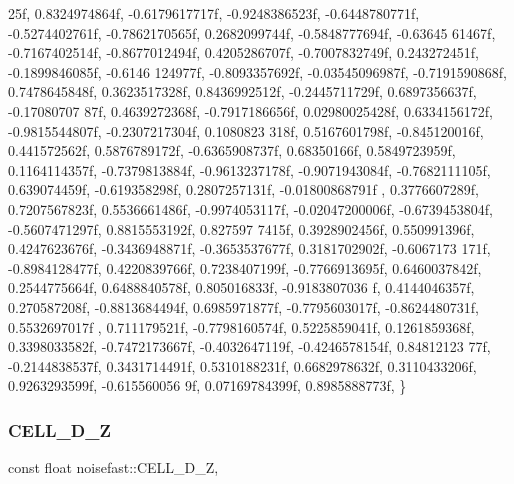 \begin{DoxyCode}
      25f, 0.8324974864f, -0.6179617717f,
    -0.9248386523f, -0.6448780771f, -0.5274402761f, -0.7862170565f, 0.2682099744f, -0.5848777694f, -0.63645
      61467f, -0.7167402514f, -0.8677012494f, 0.4205286707f, -0.7007832749f, 0.243272451f, -0.1899846085f, -0.6146
      124977f, -0.8093357692f, -0.03545096987f,
    -0.7191590868f, 0.7478645848f, 0.3623517328f, 0.8436992512f, -0.2445711729f, 0.6897356637f, -0.17080707
      87f, 0.4639272368f, -0.7917186656f, 0.02980025428f, 0.6334156172f, -0.9815544807f, -0.2307217304f, 0.1080823
      318f, 0.5167601798f, -0.845120016f,
    0.441572562f, 0.5876789172f, -0.6365908737f, 0.68350166f, 0.5849723959f, 0.1164114357f, -0.7379813884f,
       -0.9613237178f, -0.9071943084f, -0.7682111105f, 0.639074459f, -0.619358298f, 0.2807257131f, -0.01800868791f
      , 0.3776607289f, 0.7207567823f,
    0.5536661486f, -0.9974053117f, -0.02047200006f, -0.6739453804f, -0.5607471297f, 0.8815553192f, 0.827597
      7415f, 0.3928902456f, 0.550991396f, 0.4247623676f, -0.3436948871f, -0.3653537677f, 0.3181702902f, -0.6067173
      171f, -0.8984128477f, 0.4220839766f,
    0.7238407199f, -0.7766913695f, 0.6460037842f, 0.2544775664f, 0.6488840578f, 0.805016833f, -0.9183807036
      f, 0.4144046357f, 0.270587208f, -0.8813684494f, 0.6985971877f, -0.7795603017f, -0.8624480731f, 0.5532697017f
      , 0.711179521f, -0.7798160574f,
    0.5225859041f, 0.1261859368f, 0.3398033582f, -0.7472173667f, -0.4032647119f, -0.4246578154f, 0.84812123
      77f, -0.2144838537f, 0.3431714491f, 0.5310188231f, 0.6682978632f, 0.3110433206f, 0.9263293599f, -0.615560056
      9f, 0.07169784399f, 0.8985888773f,
\}
\end{DoxyCode}
\mbox{\label{classnoisefast_a32e601e4b3d2bbb1498e2edbc305c10f}} 
\subsubsection{\texorpdfstring{C\+E\+L\+L\+\_\+D\+\_\+Z}{CELL\_3D\_Z}}
{\footnotesize\ttfamily const float noisefast\+::\+C\+E\+L\+L\+\_\+D\+\_\+Z\hspace{0.3cm}{\ttfamily [static]}, {\ttfamily [private]}}

